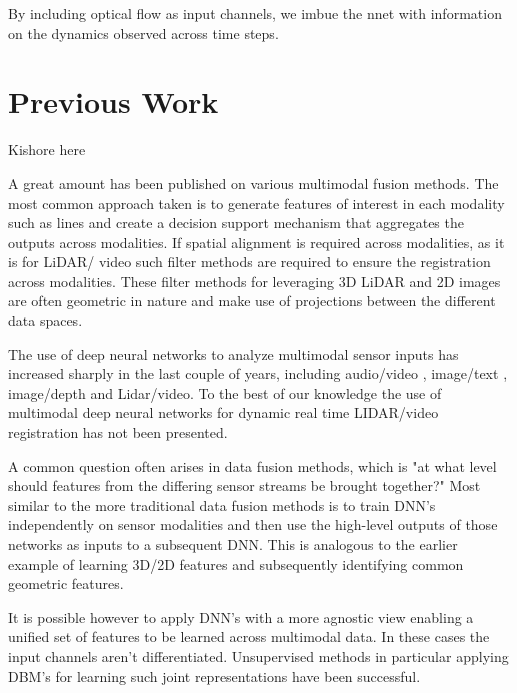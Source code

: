 \documentclass{article}
\begin{document}
By including optical flow as input channels, we imbue the nnet with information on the dynamics observed across time steps. 


\section{Previous Work} %
\label{sec:previous_work}
Kishore here

A great amount has been published on various multimodal fusion methods. The most common approach taken is to generate features of interest in each modality such as lines and create a decision support mechanism that aggregates the outputs across modalities. If spatial alignment is required across modalities, as it is for LiDAR/ video such filter methods \cite{Thrun2011Googles-dr} are required to ensure the registration across modalities. These filter methods for leveraging 3D LiDAR and 2D images are often geometric in nature and make use of projections between the different data spaces. 



The use of deep neural networks to analyze multimodal sensor inputs  has increased sharply in the last couple of years, including audio/video \cite{Ngiam2011Multimodal} \cite{Kim2013Deep-Learn}, image/text \cite{Srivastava2012Multimodal}, image/depth \cite{Lenz2013Deep-Learn} and Lidar/video. To the best of our knowledge the use of multimodal deep neural networks for dynamic real time LIDAR/video registration has not been presented.

A common question often arises in data fusion methods, which is "at what level should features from the differing sensor streams be brought together?" Most similar to the more traditional data fusion methods is to train DNN's independently on sensor modalities and then use the high-level outputs of those networks as inputs to a subsequent DNN. This is analogous to the earlier example of learning 3D/2D features and subsequently identifying common geometric features. 

It is possible however to apply DNN's with a more agnostic view enabling a unified set of features to be learned across multimodal data. In these cases the input channels aren't differentiated. Unsupervised methods in particular applying DBM's for learning such joint representations have been successful.  
\end{document}
